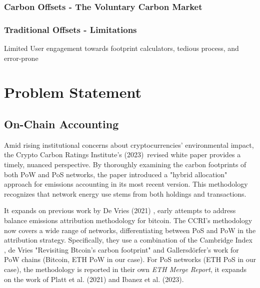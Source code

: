 \documentclass[11pt]{report}
\begin{document}
\subsubsection{Carbon Offsets - The Voluntary Carbon Market}
\subsubsection{Traditional Offsets - Limitations}


Limited User engagement towards footprint calculators, tedious process, and error-prone

\section{Problem Statement}

\subsection{On-Chain Accounting \label{se:onchain-accounting}}

Amid rising institutional concerns about cryptocurrencies' environmental impact, the Crypto Carbon Ratings Institute's (2023)\ revised white paper provides a timely, nuanced perspective. By thoroughly examining the carbon footprints of both PoW and PoS networks, the paper introduced a "hybrid allocation" approach for emissions accounting in its most recent version. This methodology recognizes that network energy use stems from both holdings and transactions.

It expands on previous work by De Vries (2021) \cite{devriesTrueCostsDigital2021}, early attempts to address balance emissions attribution methodology for bitcoin. The CCRI's methodology now covers a wide range of networks, differentiating between PoS and PoW in the attribution strategy. Specifically, they use a combination of the Cambridge Index \cite{neumuellerCambridgeBitcoinElectricity2021}, de Vries "Revisiting Btcoin's carbon footprint" \cite{devriesRevisitingBitcoinCarbon2022} and Gallersdörfer's work \cite{gallersdorferEnergyConsumptionCryptocurrencies2020} for PoW chains (Bitcoin, ETH PoW in our case). For PoS networks (ETH PoS in our case), the methodology is reported in their own \textit{ETH Merge Report}\cite{ETHMergeReport}, it expands on the work of Platt et al. (2021)\cite{plattEnergyFootprintBlockchain2021} and Ibanez et al. (2023)\cite{ibanezEnergyConsumptionProofofStake2023}.
\end{document}
